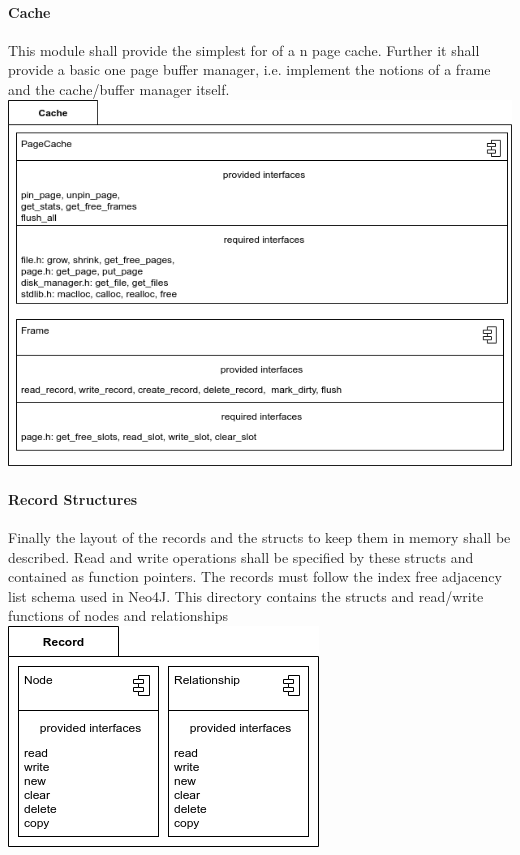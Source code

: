 			\paragraph{Cache}
				This module shall provide the simplest for of a n page cache.
				Further it shall provide a basic one page buffer manager, i.e. implement the notions of a frame and the cache/buffer manager itself.   \\
                \includegraphics[keepaspectratio, width=\textwidth]{img/cache_arch.png} \\

            
            \paragraph{Record Structures}
            Finally the layout of the records and the structs to keep them in memory shall be described. Read and write operations shall be specified by these structs and contained as function pointers. The records must follow the index free adjacency list schema used in Neo4J.  
            This directory contains the structs and read/write functions of nodes and relationships \\
            
            \includegraphics[keepaspectratio, width=\textwidth]{img/record_arch.png} \\

